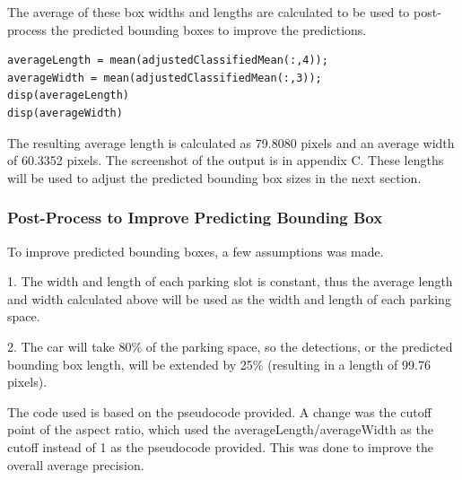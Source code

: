 \documentclass[man]{apa7}
\begin{document}
The average of these box widths and lengths are calculated to be used to post-process the predicted bounding boxes to improve the predictions.

\begin{lstlisting}[]
averageLength = mean(adjustedClassifiedMean(:,4));
averageWidth = mean(adjustedClassifiedMean(:,3));
disp(averageLength)
disp(averageWidth)
\end{lstlisting}

The resulting average length is calculated as 79.8080 pixels and an average width of 60.3352 pixels. The screenshot of the output is in appendix C. These lengths will be used to adjust the predicted bounding box sizes in the next section. 

\subsubsection{Post-Process to Improve Predicting Bounding Box}

To improve predicted bounding boxes, a few assumptions was made. 

1. The width and length of each parking slot is constant, thus the average length and width calculated above will be used as the width and length of each parking space.

2. The car will take 80\% of the parking space, so the detections, or the predicted bounding box length, will be extended by 25\% (resulting in a length of 99.76 pixels).

The code used is based on the pseudocode provided. A change was the cutoff point of the aspect ratio, which used the averageLength/averageWidth as the cutoff instead of 1 as the pseudocode provided. This was done to improve the overall average precision.
\end{document}
